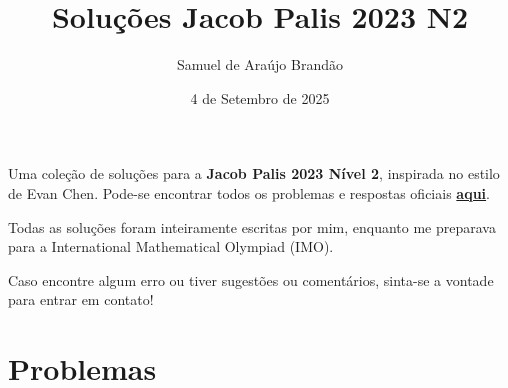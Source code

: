 \documentclass[12pt]{article}
\title{\sffamily\bfseries{Soluções Jacob Palis 2023 N2}}
\author{Samuel de Araújo Brandão}
\date{4 de Setembro de 2025}
\begin{document}
  \maketitle
  Uma coleção de soluções para a \textbf{Jacob Palis 2023 Nível 2}, inspirada no estilo de Evan Chen.
  Pode-se encontrar todos os problemas e respostas oficiais 
  \textbf{\href{https://www.obm.org.br/content/uploads/2025/04/prova_jacob_palis_2023.pdf}{aqui}}.

  Todas as soluções foram inteiramente escritas por mim, enquanto me preparava para a
  International Mathematical Olympiad (IMO).

  Caso encontre algum erro ou tiver sugestões ou comentários, sinta-se a vontade 
  para entrar em contato!

  \tableofcontents

  \clearpage

  \section{\textsf{Problemas}}
\end{document}
